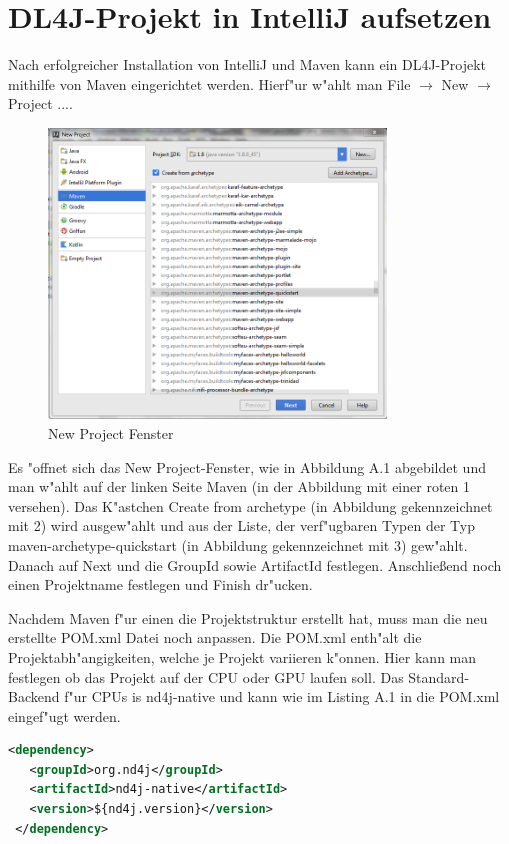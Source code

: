\chapter{DL4J-Projekt in IntelliJ aufsetzen}
{
Nach erfolgreicher Installation von IntelliJ und Maven kann ein DL4J-Projekt mithilfe von Maven eingerichtet werden. Hierf"ur w"ahlt man \glqq File\grqq{} $\rightarrow$ \glqq New\grqq{} $\rightarrow$ \glqq Project ...\grqq . 
\renewcommand{\figurename}{Abb.}
\begin{figure}[htp]
\centering
\includegraphics[width=0.80\textwidth]{pictures/mavenProj.png}
\caption[\glqq New Project\grqq{} Fenster]{\glqq New Project\grqq{} Fenster}
\end{figure}
Es "offnet sich das \glqq New Project\grqq -Fenster, wie in Abbildung A.1 abgebildet und man w"ahlt auf der linken Seite \glqq Maven\grqq{} (in der Abbildung mit einer roten 1 versehen). Das K"astchen \glqq Create from archetype\grqq{} (in Abbildung gekennzeichnet mit 2) wird ausgew"ahlt und aus der Liste, der verf"ugbaren Typen der Typ \glqq maven-archetype-quickstart\grqq{} (in Abbildung gekennzeichnet mit 3) gew"ahlt. Danach auf \glqq Next\grqq{}  und die GroupId sowie ArtifactId festlegen. Anschlie{\ss}end noch einen Projektname festlegen und \glqq Finish\grqq{} dr"ucken.


Nachdem Maven f"ur einen die Projektstruktur erstellt hat, muss man die neu erstellte POM.xml Datei noch anpassen. Die POM.xml enth"alt die Projektabh"angigkeiten, welche je Projekt variieren k"onnen. Hier kann man festlegen ob das Projekt auf der CPU oder GPU laufen soll.
Das Standard-Backend f"ur CPUs is \glqq nd4j-native\grqq{} und kann wie im Listing A.1  in die POM.xml eingef"ugt werden.
\lstset{language=XML}
\begin{lstlisting}[language=XML,caption=applicationContext.xml]
 <dependency>
   <groupId>org.nd4j</groupId>
   <artifactId>nd4j-native</artifactId>
   <version>${nd4j.version}</version>
 </dependency>
\end{lstlisting}

}
